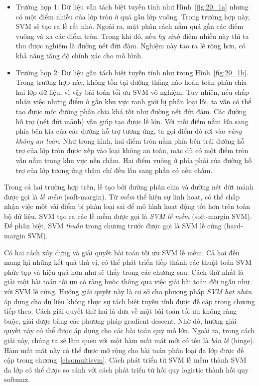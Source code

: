 \begin{itemize}
\item Trường hợp 1: Dữ liệu vẫn tách biệt tuyến tính như Hình~\ref{fig:20_1a}
nhưng có một điểm nhiễu của lớp tròn ở quá gần lớp vuông. Trong
trường hợp này, SVM sẽ tạo ra lề rất nhỏ. Ngoài ra, mặt phân cách nằm quá gần các điểm
vuông và xa các điểm tròn. Trong khi đó, nếu \textit{hy sinh} điểm
nhiễu này thì ta thu được nghiệm là đường nét đứt đậm. Nghiệm này tạo ra lề rộng hơn, có khả năng tăng độ chính xác cho mô hình.

\item Trường hợp 2: Dữ liệu gần tách biệt tuyến tính như trong Hình~\ref{fig:20_1b}. Trong trường hợp
này, không tồn tại đường thẳng nào hoàn toàn phân chia hai lớp dữ liệu, vì
vậy bài toán tối ưu SVM vô nghiệm. Tuy nhiên, nếu chấp nhận việc những điểm ở gần khu vực ranh giới bị phân loại lỗi, ta vẫn có
thể tạo được một đường phân chia khá tốt như đường nét đứt đậm. Các
đường hỗ trợ (nét đứt mảnh) vẫn giúp tạo được lề lớn. Với mỗi điểm nằm \textit{lần} sang
phía bên kia của các đường hỗ trợ tương ứng, ta gọi điểm đó rơi vào
\textit{vùng không an toàn}. Như trong hình, hai điểm tròn nằm phía bên
trái đường hỗ trợ của lớp tròn được xếp vào loại không an toàn, mặc
dù có một điểm tròn vẫn nằm trong khu vực nền chấm. Hai điểm vuông ở
phía phải của đường hỗ trợ của lớp tương ứng thậm chí đều lấn sang phần
có nền chấm.
\end{itemize}
Trong cả hai trường hợp trên, lề tạo bởi đường phân chia và đường
nét đứt mảnh được gọi là \textit{lề mềm} ({soft-margin}). Từ \textit{mềm} thể hiện sự linh hoạt, có thể chấp nhận việc một vài điểm bị phân loại sai để mô hình hoạt động tốt hơn trên toàn bộ dữ liệu. SVM tạo ra các lề mềm được gọi là \textit{SVM lề mềm} (soft-margin SVM). Để phân
biệt, SVM \textit{thuần} trong chương trước được gọi là SVM lề cứng (hard-margin SVM).

Có hai cách xây dựng và giải quyết bài toán tối ưu SVM lề mềm. Cả hai đều mang lại những kết quả thú vị, có thể phát triển tiếp thành các
thuật toán SVM phức tạp và hiệu quả hơn như sẽ thấy trong các chương sau. Cách thứ nhất là giải một bài toán tối ưu có ràng buộc thông qua việc giải bài
toán đối ngẫu như với SVM lề cứng. Hướng giải quyết này là cơ sở cho phương pháp \textit{SVM hạt nhân} áp dụng cho dữ liệu không thực
sự tách biệt tuyến tính được đề cập trong chương tiếp theo. Cách
giải quyết thứ hai là đưa về một bài toán tối ưu không ràng buộc, giải được bằng các phương pháp gradient descent. Nhờ đó, hướng giải
quyết này có thể được áp dụng cho các bài toán quy mô lớn. Ngoài ra, trong cách
giải này, chúng ta sẽ làm quen với một hàm mất mát mới có tên là \textit{bản lề} (hinge). Hàm mất mát này có thể được mở rộng cho bài toán phân loại đa lớp được đề cập trong chương~\ref{cha:multisvm}. Cách phát triển
từ SVM lề mềm thành SVM đa lớp có thể được so sánh
với cách phát triển từ hồi quy logistic thành hồi quy softmax.


